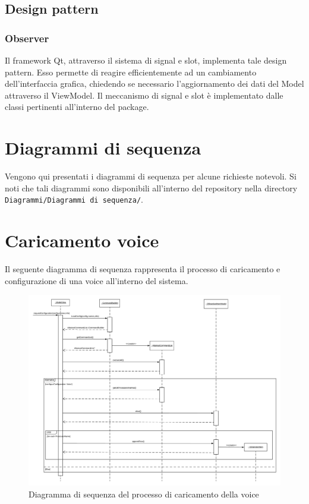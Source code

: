 \documentclass[openany,12pt,a4paper]{report}
\begin{document}
	\subsection{Design pattern}
	
	\subsubsection{Observer}
	Il framework Qt, attraverso il sistema di signal e slot, implementa tale design pattern. Esso permette di reagire efficientemente ad un cambiamento dell'interfaccia grafica, chiedendo se necessario l'aggiornamento dei dati del Model attraverso il ViewModel. Il meccanismo di signal e slot è implementato dalle classi pertinenti all'interno del package.  

	\newpage

	\section{Diagrammi di sequenza}
	
	Vengono qui presentati i diagrammi di sequenza per alcune richieste notevoli. Si noti che tali diagrammi sono disponibili all'interno del repository nella directory \verb|Diagrammi/Diagrammi di sequenza/|.
	
	\section{Caricamento voice}
	
	Il seguente diagramma di sequenza rappresenta il processo di caricamento e configurazione di una voice all'interno del sistema. 
	
	\begin{figure}[H]
		\includegraphics[scale=0.43]{CaricamentoVoice}
		\centering
		\caption{Diagramma di sequenza del processo di caricamento della voice}
	\end{figure}
	
\end{document}
